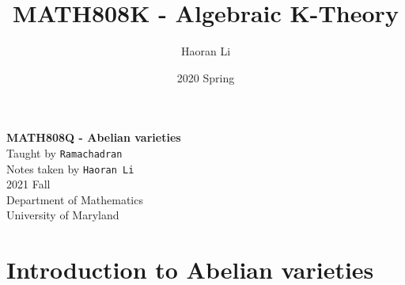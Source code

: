 \documentclass[a4paper,10pt]{article}
\title{MATH808K - Algebraic K-Theory} %
\author{Haoran Li}
\date{2020 Spring}
\begin{document}
\sloppy %

\begin{titlepage}
\begin{center}
\vspace*{1cm}
\Huge
\textbf{MATH808Q - Abelian varieties} \\
\vspace{2cm}
\vspace{2cm}
\normalsize
Taught by \texttt{Ramachadran} \\
Notes taken by \texttt{Haoran Li} \\
2021 Fall \\
\vspace{2cm}
Department of Mathematics\\
University of Maryland\\
\end{center}
\end{titlepage}

\tableofcontents
\newpage

\section{Introduction to Abelian varieties}


\begin{thebibliography}{}



\end{thebibliography}

\printindex
\newpage
\end{document}
